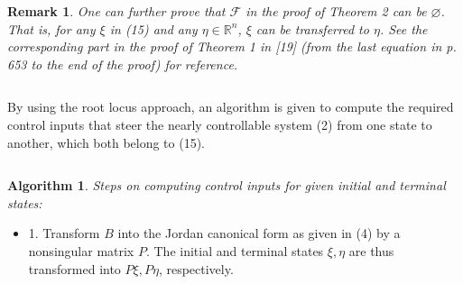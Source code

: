 \documentclass[journal,a4paper,12pt,onecolumn]{IEEEtran}
\newtheorem{algorithm}[theorem]{Algorithm}
\newtheorem{remark}[theorem]{Remark}
\begin{document}
$\left. {}\right. $

\begin{remark}
One can further prove that $\mathcal{F}$ in the proof of Theorem 2 can be $\varnothing $. That is, for any $\xi $ in (15) and any $\eta \in
\mathbb{R}
^{n}$, $\xi $ can be transferred to $\eta $. See the corresponding part in
the proof of Theorem 1 in [19] (from the last equation in p. 653 to the end
of the proof) for reference.
\end{remark}

$\left. {}\right. $

By using the root locus approach, an algorithm is given to compute the
required control inputs that steer the nearly controllable system (2) from
one state to another, which both belong to (15).

$\left. {}\right. $

\begin{algorithm}
Steps on computing control inputs for given initial and terminal states:
\end{algorithm}

\begin{itemize}
\item 1. Transform $B$ into the Jordan canonical form as given in (4) by a
nonsingular matrix $P$. The initial and terminal states $\xi ,\eta $ are
thus transformed into $P\xi ,P\eta $, respectively.
\end{itemize}
\end{document}
